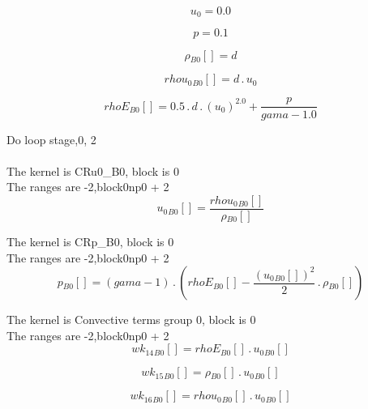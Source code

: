 \documentclass{article}
\begin{document}
\begin{dmath}u_{0} = 0.0\end{dmath}

\begin{dmath}p = 0.1\end{dmath}

\begin{dmath}{\rho{_{B0}}}[{}] = d\end{dmath}

\begin{dmath}{rhou_{0}{_{B0}}}[{}] = d \,.\, u_{0}\end{dmath}

\begin{dmath}{rhoE{_{B0}}}[{}] = 0.5 \,.\, d \,.\, \left(u_{0} \right)^{2.0} + \frac{p}{gama - 1.0}\end{dmath}

\noindent Do loop stage,0, 2\\
\\\noindent The kernel is CRu0_B0, block is 0\\\noindent The ranges are -2,block0np0 + 2\\\begin{dmath}{u_{0}{_{B0}}}[{}] = \frac{{rhou_{0}{_{B0}}}[{}]}{{\rho{_{B0}}}[{}]}\end{dmath}

\noindent The kernel is CRp_B0, block is 0\\\noindent The ranges are -2,block0np0 + 2\\\begin{dmath}{p{_{B0}}}[{}] = \left(gama - 1\right) \,.\, \left({rhoE{_{B0}}}[{}] - \frac{\left({u_{0}{_{B0}}}[{}] \right)^{2}}{2} \,.\, {\rho{_{B0}}}[{}]\right)\end{dmath}

\noindent The kernel is Convective terms group 0, block is 0\\\noindent The ranges are -2,block0np0 + 2\\\begin{dmath}{wk_{14}{_{B0}}}[{}] = {rhoE{_{B0}}}[{}] \,.\, {u_{0}{_{B0}}}[{}]\end{dmath}

\begin{dmath}{wk_{15}{_{B0}}}[{}] = {\rho{_{B0}}}[{}] \,.\, {u_{0}{_{B0}}}[{}]\end{dmath}

\begin{dmath}{wk_{16}{_{B0}}}[{}] = {rhou_{0}{_{B0}}}[{}] \,.\, {u_{0}{_{B0}}}[{}]\end{dmath}
\end{document}
